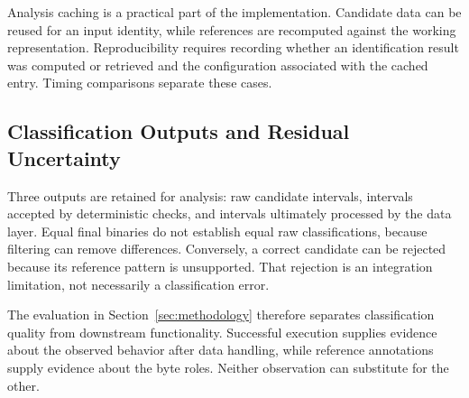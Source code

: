 Analysis caching is a practical part of the implementation. Candidate
data can be reused for an input identity, while references are recomputed
against the working representation. Reproducibility requires recording
whether an identification result was computed or retrieved and the
configuration associated with the cached entry. Timing comparisons
separate these cases.

\subsection{Classification Outputs and Residual Uncertainty}
Three outputs are retained for analysis: raw candidate intervals,
intervals accepted by deterministic checks, and intervals ultimately
processed by the data layer. Equal final binaries do not establish
equal raw classifications, because filtering can remove differences.
Conversely, a correct candidate can be rejected because its reference
pattern is unsupported. That rejection is an integration limitation,
not necessarily a classification error.

The evaluation in Section~\ref{sec:methodology} therefore separates
classification quality from downstream functionality. Successful
execution supplies evidence about the observed behavior after data
handling, while reference annotations supply evidence about the byte
roles. Neither observation can substitute for the other.
